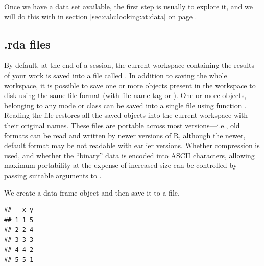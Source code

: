 \documentclass[krantz2]{krantz}\usepackage{knitr}
\begin{document}
\begin{knitrout}\footnotesize
{}\color{fgcolor}\begin{kframe}
\begin{alltt}
\end{alltt}
\end{kframe}
\end{knitrout}

Once we have a data set available, the first step is usually to explore it, and we will do this with  in section \ref{sec:calc:looking:at:data} on page \pageref{sec:calc:looking:at:data}.

\subsection{.rda files}\label{sec:data:rda}

By default, at the end of a session, the current workspace containing the results of your work is saved into a file called . In addition to saving the whole workspace, it is possible to save one or more \Rlang objects present in the workspace to disk using the same file format (with file name tag  or ). One or more objects, belonging to any mode or class can be saved into a single file using function . Reading the file restores all the saved objects into the current workspace with their original names. These files are portable across most \Rlang versions---i.e., old formats can be read and written by newer versions of R, although the newer, default format may be not readable with earlier \Rlang versions. Whether compression is used, and whether the ``binary'' data is encoded into ASCII characters, allowing maximum portability at the expense of increased size can be controlled by passing suitable arguments to .

We create a data frame object and then save it to a file.

\begin{knitrout}\footnotesize
{}\color{fgcolor}\begin{kframe}
\begin{alltt}
 \hlkwb{<-} \hlstd{(} \hlstd{=} \hlopt{:}\hlstd{,}  \hlstd{=} \hlopt{:}\hlstd{)}
\end{alltt}
\begin{verbatim}
##   x y
## 1 1 5
## 2 2 4
## 3 3 3
## 4 4 2
## 5 5 1
\end{verbatim}
\begin{alltt}
  \hlstd{=} \hlstd{)}
\end{alltt}
\end{kframe}
\end{knitrout}
\end{document}
